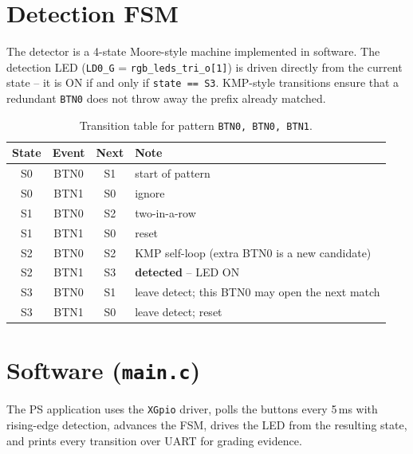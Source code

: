 \documentclass[11pt,letterpaper]{article}
\begin{document}
\section{Detection FSM}

The detector is a 4-state Moore-style machine implemented in software.
The detection LED (\texttt{LD0\_G} = \texttt{rgb\_leds\_tri\_o[1]}) is
driven directly from the current state -- it is ON if and only if
\texttt{state == S3}. KMP-style transitions ensure that a redundant
\texttt{BTN0} does not throw away the prefix already matched.

\begin{table}[H]
    \centering
    \caption{Transition table for pattern \texttt{BTN0, BTN0, BTN1}.}
    \label{tab:fsm}
    \small
    \begin{tabular}{cccl}
        \toprule
        \textbf{State} & \textbf{Event} & \textbf{Next} & \textbf{Note} \\
        \midrule
        S0 & BTN0 & S1 & start of pattern                                  \\
        S0 & BTN1 & S0 & ignore                                             \\
        S1 & BTN0 & S2 & two-in-a-row                                       \\
        S1 & BTN1 & S0 & reset                                              \\
        S2 & BTN0 & S2 & KMP self-loop (extra BTN0 is a new candidate)      \\
        S2 & BTN1 & S3 & \textbf{detected} -- LED ON                        \\
        S3 & BTN0 & S1 & leave detect; this BTN0 may open the next match    \\
        S3 & BTN1 & S0 & leave detect; reset                                \\
        \bottomrule
    \end{tabular}
\end{table}

\section{Software (\texttt{main.c})}

The PS application uses the \texttt{XGpio} driver, polls the buttons
every 5\,ms with rising-edge detection, advances the FSM, drives the
LED from the resulting state, and prints every transition over UART
for grading evidence.
\end{document}
